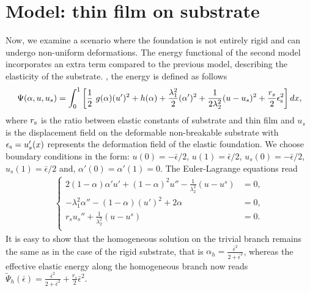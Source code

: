 \section{Model: thin film  on   substrate }
\label{sec:non-rigid}

Now, we examine a scenario where the foundation is not entirely rigid and can undergo non-uniform deformations. The energy functional of the second model incorporates an extra term compared to the previous model, describing the elasticity of the substrate. , the energy is defined as follows
\begin{equation}
\label{model_elastic_substrate}
\Psi(\alpha, u,u_s) = \int_{0}^1 \left[ \frac{1}{2} \ g(\alpha)(u')^2 + h(\alpha) + \frac{\lambda_1^2}{2}(\alpha')^2 
+ \frac{1}{2 \lambda_2^2} (u-u_s)^2 
+ \frac{r_{s}}{2}  \epsilon_{\rm s}^2 \right] dx,
\end{equation}
where $r_{\rm s}$ is the ratio between elastic constants of substrate and thin film and $u_s$ is the displacement field on the deformable non-breakable substrate with $\epsilon_{\rm s}=u_s'(x)$ represents the deformation field of the elastic foundation. We  choose boundary conditions in the form: $u(0)=-\bar\epsilon/2$, $u(1)=\bar\epsilon/2$,  $u_s(0)=-\bar\epsilon/2$, $u_s(1)=\bar\epsilon/2$ and, $\alpha'(0)=\alpha'(1)=0$.  The Euler-Lagrange equations read
\begin{eqnarray}\label{modeld_el_1}
\begin{cases}
  2(1-\alpha)\alpha' u' +(1-\alpha)^2 u'' -  \frac{1}{\lambda_2^2}(u-u^s) &= 0, \\
  -\lambda_1^2\alpha'' - (1-\alpha)( u')^2 + 2\alpha   &= 0,\\
    r_su_s''  +  \frac{1}{\lambda_2^2}(u-u^s) &= 0. \\
\end{cases}
\label{auto2}
\end{eqnarray}
It is easy to show that the homogeneous solution on the trivial branch remains the same as in the case of the rigid substrate, that is $\alpha_h = \frac{\bar{\epsilon}^2}{2 + \bar{\epsilon}^2}\label{eq:homo11}$, whereas the effective elastic energy along the homogeneous branch now reads $\tilde \Psi_h(\bar{\epsilon}) = \frac{\bar{\epsilon}^2}{2 + \bar{\epsilon}^2} + \frac{r_s}{2}\bar{\epsilon}^2$. 

